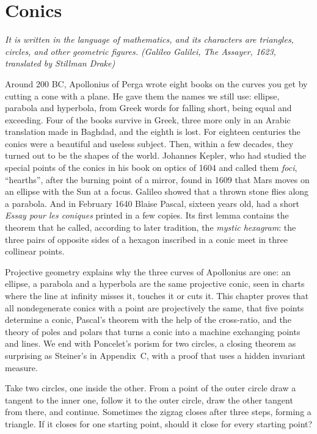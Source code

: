 \chapter{Conics}\label{geometry:ch:conics}

\begin{center}\itshape
It is written in the language of mathematics, and its characters are triangles, circles, and other geometric figures.
\upshape(Galileo Galilei, \emph{The Assayer}, 1623, translated by Stillman Drake)
\end{center}

Around 200 BC, Apollonius of Perga wrote eight books on the curves you get by cutting a cone with a plane. He gave them the names we
still use: ellipse, parabola and hyperbola, from Greek words for falling short, being equal and exceeding. Four of the books survive in Greek,
three more only in an Arabic translation made in Baghdad, and the eighth is lost. For eighteen centuries the conics were a beautiful and
useless subject. Then, within a few decades, they turned out to be the shapes of the world. Johannes Kepler, who had studied the special points of
the conics in his book on optics of 1604 and called them \emph{foci}, ``hearths'', after the burning point of a mirror, found in 1609 that Mars moves
on an ellipse with the Sun at a focus. Galileo showed that a thrown stone flies along a parabola. And in February 1640 Blaise Pascal, sixteen years old,
had a short \emph{Essay pour les coniques} printed in a few copies. Its first lemma contains the theorem that he called, according to later
tradition, the \emph{mystic hexagram}: the three pairs of opposite sides of a hexagon inscribed in a conic meet in three collinear points.

Projective geometry explains why the three curves of Apollonius are one: an ellipse, a parabola and a hyperbola are the same projective conic,
seen in charts where the line at infinity misses it, touches it or cuts it. This chapter proves that all nondegenerate conics with a point are
projectively the same, that five points determine a conic, Pascal's theorem with the help of the cross-ratio, and the theory of poles and polars
that turns a conic into a machine exchanging points and lines. We end with Poncelet's porism for two circles, a closing theorem as surprising
as Steiner's in Appendix~C, with a proof that uses a hidden invariant measure.

\begin{think}
Take two circles, one inside the other. From a point of the outer circle draw a tangent to the inner one, follow it to the outer circle, draw the
other tangent from there, and continue. Sometimes the zigzag closes after three steps, forming a triangle. If it closes for one starting point,
should it close for every starting point?
\end{think}

